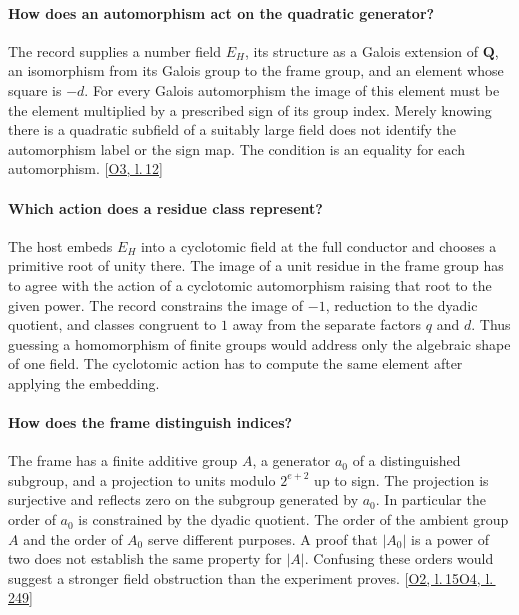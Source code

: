 \documentclass[12pt,letterpaper]{article}
\begin{document}
\paragraph{How does an automorphism act on the quadratic generator?}
The record supplies a number field $E_H$, its structure as a Galois extension of $\mathbf Q$, an isomorphism from its Galois group to the frame group, and an element whose square is $-d$. For every Galois automorphism the image of this element must be the element multiplied by a prescribed sign of its group index. Merely knowing there is a quadratic subfield of a suitably large field does not identify the automorphism label or the sign map. The condition is an equality for each automorphism.  {\footnotesize\sffamily\color{mute}[\href{https://github.com/nousentllc/riemann-hypothesis/blob/40e56bab026552e089d7afcfeff08d2defb9c005/src/Formalism/SharpRestriction/RamificationFrobenius/TotientGaloisClasses/ConjEMemHostFIff.lean\#L12}{O3, l.\,12}]}

\paragraph{Which action does a residue class represent?}
The host embeds $E_H$ into a cyclotomic field at the full conductor and chooses a primitive root of unity there. The image of a unit residue in the frame group has to agree with the action of a cyclotomic automorphism raising that root to the given power. The record constrains the image of $-1$, reduction to the dyadic quotient, and classes congruent to $1$ away from the separate factors $q$ and $d$. Thus guessing a homomorphism of finite groups would address only the algebraic shape of one field. The cyclotomic action has to compute the same element after applying the embedding.

\paragraph{How does the frame distinguish indices?}
The frame has a finite additive group $A$, a generator $a_0$ of a distinguished subgroup, and a projection to units modulo $2^{e+2}$ up to sign. The projection is surjective and reflects zero on the subgroup generated by $a_0$. In particular the order of $a_0$ is constrained by the dyadic quotient. The order of the ambient group $A$ and the order of $A_0$ serve different purposes. A proof that $|A_0|$ is a power of two does not establish the same property for $|A|$. Confusing these orders would suggest a stronger field obstruction than the experiment proves.  {\footnotesize\sffamily\color{mute}[\href{https://github.com/nousentllc/riemann-hypothesis/blob/40e56bab026552e089d7afcfeff08d2defb9c005/src/Formalism/SharpRestriction/RamificationFrobenius/TotientGaloisClasses/ZsmulGeneratorEqZeroOfProjection.lean\#L15}{O2, l.\,15}\enspace \href{https://github.com/nousentllc/riemann-hypothesis/blob/40e56bab026552e089d7afcfeff08d2defb9c005/src/Formalism/SharpRestriction/RamificationFrobenius/TotientGaloisClasses/FrameFacts.lean\#L249}{O4, l.\,249}]}
\end{document}
